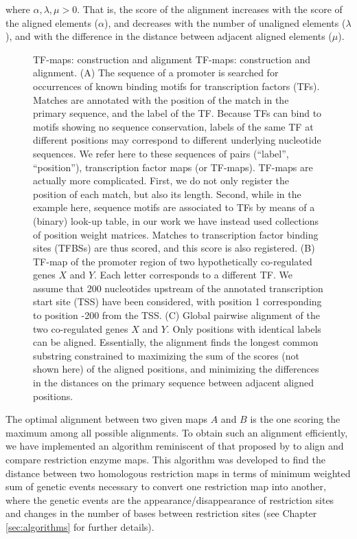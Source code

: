 where $\alpha, \lambda, \mu > 0$.
That is, the score of the alignment increases with the score of the
aligned elements ($\alpha$), and decreases with the number of
unaligned elements ($\lambda$), and with the difference in the distance 
between adjacent aligned elements ($\mu$).

\begin{figure}[t!]
\begin{center}
\setlength{\fboxsep}{0pt}
          {TF-maps: construction and alignment}%
          {TF-maps: construction and alignment.}%
          {(A) The sequence of a promoter is searched for occurrences of known
binding motifs for transcription factors (TFs). Matches are annotated with
the position of the match in the primary sequence, and the label of
the TF. Because TFs can bind to
motifs showing no sequence conservation, labels of the same
TF at different positions may correspond to
different underlying nucleotide sequences. We refer here to these
sequences of pairs (``label'', ``position''), transcription factor
maps (or TF-maps). TF-maps are actually more complicated. First, we do
not only register the position of each match, but also its
length. Second, while in the example here, sequence motifs
are associated to TFs by means of a (binary) look-up table, in our
work we have instead used collections of position weight
matrices. Matches to transcription factor binding sites (TFBSs) are thus
scored, and this score is also registered.
(B) TF-map of the promoter region of two hypothetically co-regulated genes
$X$ and $Y$.
Each letter corresponds to a different TF. We assume
that 200 nucleotides upstream of the annotated transcription start site 
(TSS) have been considered, with position 1 corresponding to position 
-200 from the TSS.
(C) Global pairwise alignment of the two co-regulated genes $X$ and $Y$. 
Only positions with identical labels can be aligned. Essentially, the 
alignment finds the longest common substring constrained to maximizing the 
sum of the scores (not shown here) of the aligned positions, and minimizing 
the differences in the distances on the primary sequence between 
adjacent aligned positions.}
\end{center}
\end{figure}


The optimal alignment between two given maps $A$ and $B$ is the
one scoring the maximum among all possible alignments. To obtain such
an alignment efficiently, we have implemented an algorithm reminiscent
of that proposed by \citet{waterman:1984c} to align and compare
restriction enzyme maps. This algorithm was developed to find the
distance between two homologous restriction maps in terms of minimum
weighted sum of genetic events necessary to convert one restriction
map into another, where the genetic events are the
appearance/disappearance of restriction sites and changes in the
number of bases between restriction sites (see Chapter \ref{sec:algorithms}
for further details).

